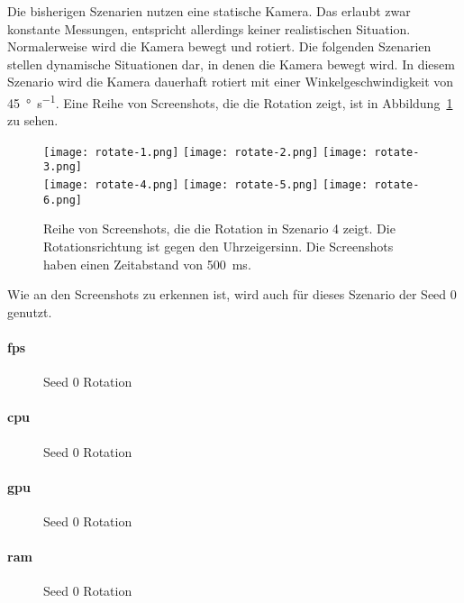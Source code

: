 Die bisherigen Szenarien nutzen eine statische Kamera. Das erlaubt zwar konstante Messungen, entspricht allerdings keiner realistischen Situation. Normalerweise wird die Kamera bewegt und rotiert. Die folgenden Szenarien stellen dynamische Situationen dar, in denen die Kamera bewegt wird. In diesem Szenario wird die Kamera dauerhaft rotiert mit einer Winkelgeschwindigkeit von \SI{45}{\degree\per\second}. Eine Reihe von Screenshots, die die Rotation zeigt, ist in Abbildung~\ref{fig:rotate} zu sehen.
\begin{figure}
	\centering
	\texttt{[image: rotate-1.png]}
	\texttt{[image: rotate-2.png]}
	\texttt{[image: rotate-3.png]}\\[4pt]
	\texttt{[image: rotate-4.png]}
	\texttt{[image: rotate-5.png]}
	\texttt{[image: rotate-6.png]}
	\caption{Reihe von Screenshots, die die Rotation in Szenario 4 zeigt. Die Rotationsrichtung ist gegen den Uhrzeigersinn. Die Screenshots haben einen Zeitabstand von \SI{500}{\milli\second}.}\label{fig:rotate}
\end{figure}
Wie an den Screenshots zu erkennen ist, wird auch für dieses Szenario der Seed 0 genutzt.

\paragraph{\ac{fps}}
\begin{figure}[!htbp]
	\caption{Seed 0 Rotation}\label{fig:seed-0-rotate-fps}
\end{figure}

\paragraph{\ac{cpu}}
\begin{figure}[!htbp]
	\caption{Seed 0 Rotation}\label{fig:seed-0-rotate-cpu}
\end{figure}

\paragraph{\ac{gpu}}
\begin{figure}[!htbp]
	\caption{Seed 0 Rotation}\label{fig:seed-0-rotate-gpu}
\end{figure}

\paragraph{\ac{ram}}
\begin{figure}[!htbp]
	\caption{Seed 0 Rotation}\label{fig:seed-0-rotate-mem}	
\end{figure} 

